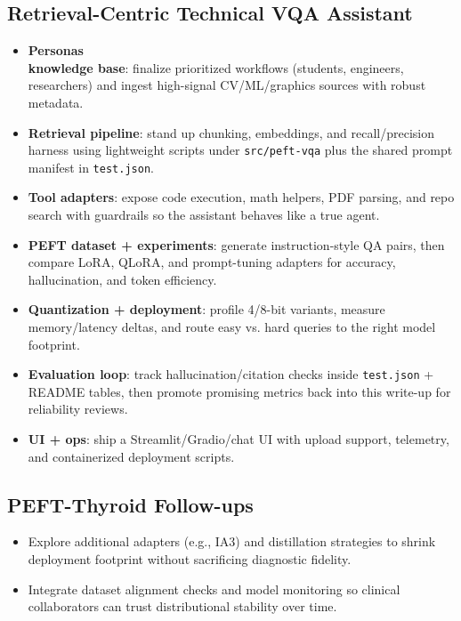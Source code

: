 \documentclass[11pt]{article}
\begin{document}
\subsection{Retrieval-Centric Technical VQA Assistant}
\begin{itemize}[leftmargin=*]
\item \textbf{Personas \\ knowledge base}: finalize prioritized
    workflows (students, engineers, researchers) and ingest high-signal
    CV/ML/graphics sources with robust metadata.
\item \textbf{Retrieval pipeline}: stand up chunking, embeddings, and
    recall/precision harness using lightweight scripts under
    \texttt{src/peft-vqa} plus the shared prompt manifest in
    \texttt{test.json}.
\item \textbf{Tool adapters}: expose code execution, math helpers, PDF
    parsing, and repo search with guardrails so the assistant behaves like
    a true agent.
\item \textbf{PEFT dataset + experiments}: generate instruction-style QA
    pairs, then compare LoRA, QLoRA, and prompt-tuning adapters for
    accuracy, hallucination, and token efficiency.
\item \textbf{Quantization + deployment}: profile 4/8-bit variants,
    measure memory/latency deltas, and route easy vs. hard queries to the
    right model footprint.
\item \textbf{Evaluation loop}: track hallucination/citation checks
    inside \texttt{test.json} + README tables, then promote promising
    metrics back into this write-up for reliability reviews.
\item \textbf{UI + ops}: ship a Streamlit/Gradio/chat UI with upload
    support, telemetry, and containerized deployment scripts.
\end{itemize}

\subsection{PEFT-Thyroid Follow-ups}
\begin{itemize}[leftmargin=*]
\item Explore additional adapters (e.g., IA3) and distillation
    strategies to shrink deployment footprint without sacrificing
    diagnostic fidelity.
\item Integrate dataset alignment checks and model monitoring so
    clinical collaborators can trust distributional stability over time.
\end{itemize}
\end{document}
